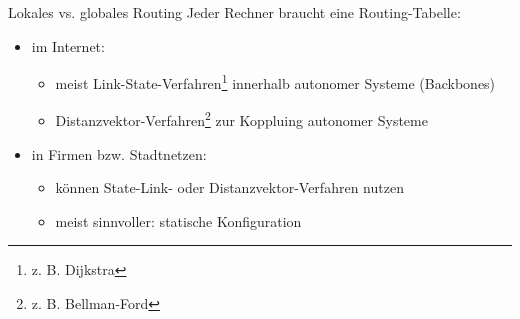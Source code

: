 \begin{bonus}{Lokales vs. globales Routing}
    Jeder Rechner braucht eine Routing-Tabelle:
    \begin{itemize}
        \item im Internet:
              \begin{itemize}
                  \item meist Link-State-Verfahren\footnote{z. B. Dijkstra} innerhalb autonomer Systeme (Backbones)
                  \item Distanzvektor-Verfahren\footnote{z. B. Bellman-Ford} zur Koppluing autonomer Systeme
              \end{itemize}
        \item in Firmen bzw. Stadtnetzen:
              \begin{itemize}
                  \item können State-Link- oder Distanzvektor-Verfahren nutzen
                  \item meist sinnvoller: statische Konfiguration
              \end{itemize}
    \end{itemize}
\end{bonus}